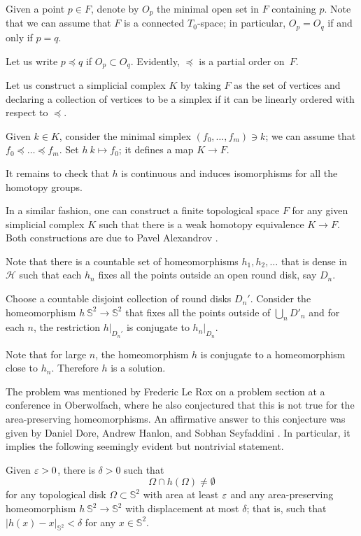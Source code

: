 Given a point $p\in F$,
denote by $O_p$ the minimal open set in $F$ containing $p$. 
Note that we can assume that $F$ is a connected $T_0$-space;
in particular, $O_p=O_q$ if and only if $p=q$.

Let us write $p\preccurlyeq q$ 
if $O_p\subset O_q$.
Evidently, $\preccurlyeq$ is a partial order on~$F$.

Let us construct a simplicial complex $K$ 
by taking $F$ as the set of vertices
and declaring a collection of vertices to be a simplex 
if it can be linearly ordered with respect to $\preccurlyeq$.

Given $k\in K$,
consider the minimal simplex $(f_0,\dots,f_m)\ni k$;
we can assume that $f_0\preccurlyeq \dots\preccurlyeq f_m$.
Set $h\:k\mapsto f_0$;
it defines a map $K\to F$.

It remains to check that $h$ is continuous 
and induces isomorphisms for all the homotopy groups.
\qeds

In a similar fashion, one can construct a finite topological space $F$ for any given simplicial complex $K$ 
such that 
there is a weak homotopy equivalence $K\to F$.
Both constructions are due to Pavel Alexandrov
\cite{alexandrov-finite,mccord}.

Note that there is a countable set of homeomorphisms $h_1,h_2,\dots$ that is dense in $\mathcal{H}$
such that
each $h_n$ fixes all the points outside an open round disk, say $D_n$.

Choose a countable disjoint collection of round disks $D_n'$.
Consider the homeomorphism $h\:\mathbb S^2\to \mathbb S^2$
that fixes all the points outside of $\bigcup_nD'_n$ and
for each $n$,
the restriction $h|_{D_n'}$ is conjugate to $h_n|_{D_n}$. 


Note that for large $n$, the homeomorphism $h$ is conjugate to a homeomorphism close to $h_n$.
Therefore $h$ is a solution.
\qeds

The problem was mentioned by Frederic Le Rox \cite{rox} on a problem section at a conference in Oberwolfach, 
where he also conjectured that this is not true for the area-preserving homeomorphisms.
An affirmative answer to this conjecture was given by Daniel Dore, Andrew Hanlon, and Sobhan Seyfaddini 
\cite{dore-hanlon,seyfaddini}.
In particular, it implies the following seemingly evident but nontrivial statement.

\begin{pr}
Given $\varepsilon>0$, there is $\delta>0$ such that 
\[\Omega\cap h(\Omega)\ne\emptyset\]
for any topological disk $\Omega\subset \mathbb{S}^2$ with area at least $\varepsilon$
and 
any area-preserving homeomorphism $h\:\mathbb{S}^2\to\mathbb{S}^2$ with displacement at most $\delta$;
that is, such that $|h(x)-x|_{\mathbb{S}^2}<\delta$ for any $x\in \mathbb{S}^2$. 
\end{pr}


